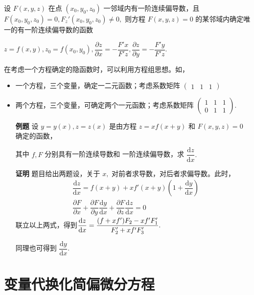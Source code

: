 
设 $ F(x,y,z) $ 在点 $ (x_0,y_0,z_0) $ 一邻域内有一阶连续偏导数，且 $ F(x_0,y_0,z_0) = 0, F_z'(x_0,y_0,z_0) \neq 0, $ 
则方程 $ F(x,y,z) = 0 $ 的某邻域内确定唯一的有一阶连续偏导数的函数 

$ z = f(x,y), z_0 = f(x_0,y_0),
\dfrac{\partial z}{\partial x} = - \dfrac{F'x}{F'z},\dfrac{\partial z}{\partial y} = - \dfrac{F'y}{F'z}.  $ 

在考虑一个方程确定的隐函数时，可以利用方程组思想。如，
\begin{itemize}
    \item 一个方程，三个变量，确定一二元函数；考虑系数矩阵 $ \begin{pmatrix}
        1&1&1
    \end{pmatrix} $ 
    \item 两个方程，三个变量，可确定两个一元函数；考虑系数矩阵 $ \begin{pmatrix}
        1&1&1\\0&1&1
    \end{pmatrix}. $ 
\end{itemize}

\begin{itemize}
    \item[\textbf{例题}] 设 $ y = y(x),z = z(x) $ 是由方程 $ z = xf(x + y) $ 和 
    $ F(x,y,z) = 0 $ 确定的函数，
    
    其中 $ f,F $ 分别具有一阶连续导数和
    一阶连续偏导数，求 $ \dfrac{\mathrm{d}z}{\mathrm{d}x}. $ 
    \item[\textbf{证明}]
    题目给出两题设，关于 $ x, $ 对前者求导数，对后者求偏导数。此时，
    \begin{equation*}
        \begin{aligned}
            &\dfrac{\mathrm{d}z}{\mathrm{d}x} = f(x+y)+xf'(x+y)(1+\dfrac{\mathrm{d}y}{\mathrm{d}x}) \\ 
            &\dfrac{\partial F}{\partial x}+\dfrac{\partial F}{\partial y}\dfrac{\mathrm{d}y}{\mathrm{d}x}
            + \dfrac{\partial F}{\partial z}\dfrac{\mathrm{d}z}{\mathrm{d}x} = 0
        \end{aligned}
    \end{equation*}
    联立以上两式，得到$ \displaystyle \dfrac{\mathrm{d}z}{\mathrm{d}x} = \dfrac{(f+xf')F_2 - xf'F_1'}{F_2'+xf'F_3'}. $ 

    同理也可得到 $ \dfrac{\mathrm{d}y}{\mathrm{d}x}. $ 
\end{itemize}

\section{变量代换化简偏微分方程}

